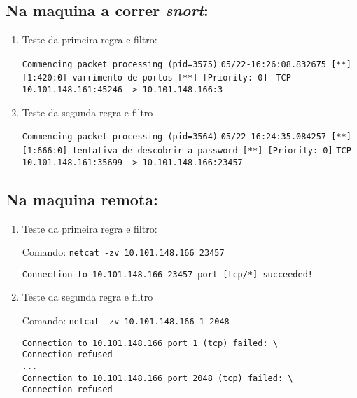 \documentclass[12pt, a4paper, twoside]{report} %
\begin{document}
\subsection{Na maquina a correr \textit{snort}:}

\begin{enumerate}

\item Teste da primeira regra e filtro:

\texttt{Commencing packet processing (pid=3575)}
\texttt{05/22-16:26:08.832675  [**] [1:420:0] varrimento de portos [**] [Priority: 0] }
\texttt{{TCP} 10.101.148.161:45246 -> 10.101.148.166:3}

\item Teste da segunda regra e filtro

\texttt{Commencing packet processing (pid=3564)}
\texttt{05/22-16:24:35.084257  [**] [1:666:0] tentativa de descobrir a password [**] [Priority: 0]}
\texttt{{TCP} 10.101.148.161:35699 -> 10.101.148.166:23457}

\end{enumerate}

\subsection{Na maquina remota:}

\begin{enumerate}

\item Teste da primeira regra e filtro:

Comando: \texttt{netcat -zv 10.101.148.166 23457}

\begin{lstlisting}
Connection to 10.101.148.166 23457 port [tcp/*] succeeded!
\end{lstlisting}

\item Teste da segunda regra e filtro

\noindent Comando: \texttt{netcat -zv 10.101.148.166 1-2048}

\begin{lstlisting}
Connection to 10.101.148.166 port 1 (tcp) failed: \
Connection refused
...
Connection to 10.101.148.166 port 2048 (tcp) failed: \
Connection refused
\end{lstlisting}

\end{enumerate}
\end{document}
